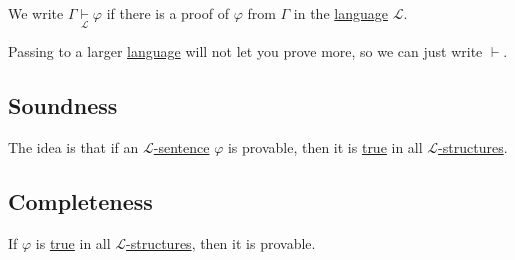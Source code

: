 \begin{notation}
	We write \(\Gamma \underset{\mathcal{L} }{\vdash } \varphi \) if there is a proof of \(\varphi \) from \(\Gamma \) in the \hyperref[def:language]{language} \(\mathcal{L} \).
\end{notation}

\begin{note}
	Passing to a larger \hyperref[def:language]{language} will not let you prove more, so we can just write \(\vdash \).
\end{note}

\subsection{Soundness}
The idea is that if an \hyperref[def:sentence]{\(\mathcal{L} \)-sentence} \(\varphi \) is provable, then it is \hyperref[def:truth]{true} in all \hyperref[def:structure]{\(\mathcal{L} \)-structures}.



\subsection{Completeness}
If \(\varphi \) is \hyperref[def:truth]{true} in all \hyperref[def:structure]{\(\mathcal{L} \)-structures}, then it is provable.



